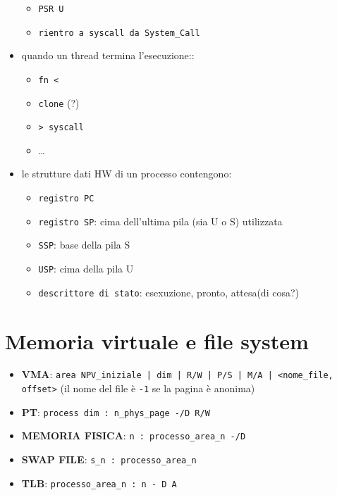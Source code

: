 \documentclass[12pt, a4paper]{report}
\begin{document}
\begin{itemize}
\begin{itemize}
			\item \texttt{PSR U}
			\item \texttt{rientro a syscall da System\_Call}
		\end{itemize}
	\item quando un thread termina l'esecuzione::
		\begin{itemize}
			\item \texttt{fn <}
			\item \texttt{clone} (?) %
			\item \texttt{> syscall}
			\item \dots
		\end{itemize}
	\item le strutture dati HW di un processo contengono:
		\begin{itemize}
			\item \texttt{registro PC}
			\item \texttt{registro SP}: cima dell'ultima pila (sia U o S) 
				utilizzata
			\item \texttt{SSP}: base della pila S
			\item \texttt{USP}: cima della pila U
			\item \texttt{descrittore di stato}: esexuzione, pronto, attesa(di
				cosa?)
		\end{itemize}
\end{itemize}


\newpage
\section*{Memoria virtuale e file system}

\begin{itemize}
	\item \textbf{VMA}: \texttt{area NPV\_iniziale | dim | R/W | P/S | M/A |
		<nome\_file, offset>}
		(il nome del file è \texttt{-1} se la pagina è anonima)
	\item \textbf{PT}: \texttt{process dim : n\_phys\_page -/D R/W}
	\item \textbf{MEMORIA FISICA}: \texttt{n : processo\_area\_n -/D}
	\item \textbf{SWAP FILE}: \texttt{s\_n : processo\_area\_n}
	\item \textbf{TLB}: \texttt{processo\_area\_n : n - D A}
\end{itemize}
\end{document}
